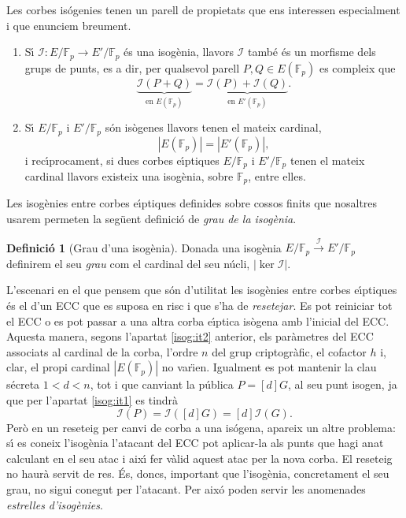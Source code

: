 \documentclass[12pt,twoside,catalan,a4paper]{book}%
\numberwithin{figure}{section}		%
\theoremstyle{definition}   			%
\newtheorem{defi}{Definici\'o}[chapter]%
\def\ce{corba e\lgem{}\'{\i}ptica}%
\def\ces{corbes e\lgem{}\'{\i}ptiques}%
\def\cfs{cossos finits}%
\newcommand{\Fp}{\ensuremath{\mathbb{F}_p}}%
\theoremstyle{saltolinea}   			%
\begin{document}
Les corbes is\'ogenies tenen un parell de propietats que ens interessen especialment i que enunciem breument.
\begin{enumerate}
	\item\label{isog:it1} S\'{\i} $\mathcal{I}: E/\Fp\rightarrow E'/\Fp$ \'es una isog\`enia, llavors $\mathcal{I}$ tamb\'e \'es un morfisme dels grups de punts, es a dir, per qualsevol parell $P,Q\in E(\Fp)$ es compleix que 
$$\underbrace{\mathcal{I}(P+Q)}_{\text{en }E(\Fp)}=\underbrace{\mathcal{I}(P)+\mathcal{I}(Q)}_{\text{en }E'(\Fp)}.$$
	\item\label{isog:it2} S\'{\i} $E/\Fp$ i $E'/\Fp$ s\'on is\`ogenes llavors tenen el mateix cardinal,
$$|E(\Fp)|=|E'(\Fp)|,$$ 
i rec\'{\i}procament, si dues \ces{} $E/\Fp$ i $E'/\Fp$ tenen el mateix cardinal llavors existeix una isog\`enia, sobre $\Fp$, entre elles.
\end{enumerate}

Les isog\`enies entre \ces{} definides sobre \cfs{} que nosaltres usarem permeten la seg\"uent definici\'o de \emph{grau de la isog\`enia}.
\begin{defi}[Grau d'una isog\`enia] Donada una isog\`enia $E/\Fp\xrightarrow{\mathcal{I}}E'/\Fp$ definirem el seu \emph{grau} com el cardinal del seu n\'ucli, $|\ker\mathcal{I}|$.\end{defi}
L'escenari en el que pensem que s\'on d'utilitat les isog\`enies entre \ces{} \'es el d'un ECC que es suposa en risc i que s'ha de \emph{resetejar}. Es pot reiniciar tot el ECC o es pot passar a una altra \ce{} is\`ogena amb l'inicial del ECC. Aquesta manera, segons l'apartat \ref{isog:it2} anterior, els par\`ametres del ECC associats al cardinal de la corba, l'ordre $n$ del grup criptogr\`afic, el cofactor $h$ i, clar, el propi cardinal $|E(\Fp)|$ no var\"{\i}en. Igualment es pot mantenir la clau s\'ecreta $1<d<n$, tot i que canviant la p\'ublica $P=[d]G$, al seu punt isogen, ja que per l'apartat \ref{isog:it1} es tindr\`a 
\begin{equation}\label{eq:isoclav}\mathcal{I}(P)=\mathcal{I}([d]G)=[d]\mathcal{I}(G).\end{equation}
Per\`o en un reseteig per canvi de corba a una is\'ogena, apareix un altre problema: s\'{\i} es coneix l'isog\`enia l'atacant del ECC pot aplicar-la als punts que hagi anat calculant en el seu atac i aix\'{\i} fer v\`alid aquest atac per la nova corba. El reseteig no haur\`a servit de res. \'Es, doncs, important que l'isog\`enia, concretament el seu grau, no sigui conegut per l'atacant. Per aix\'o poden servir les anomenades \emph{estrelles d'isog\`enies}.
\end{document}

